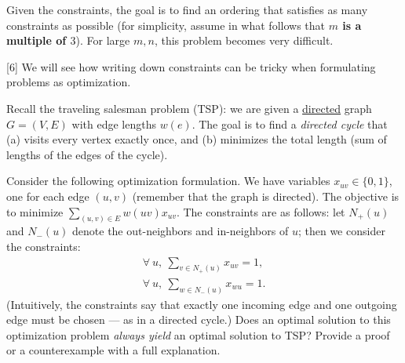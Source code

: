 \documentclass[addpoints, 11pt]{exam}
\begin{document}
\begin{questions}
Given the constraints, the goal is to find an ordering that satisfies as many constraints as possible (for simplicity, assume in what follows that {\bf $m$ is a multiple of $3$}). For large $m, n$, this problem becomes very difficult. 


[6]
We will see how writing down constraints can be tricky when formulating problems as optimization.

Recall the traveling salesman problem (TSP): we are given a \underline{directed} graph $G = (V, E)$ with edge lengths $w(e)$.  The goal is to find a {\em directed cycle} that (a) visits every vertex exactly once, and (b) minimizes the total length (sum of lengths of the edges of the cycle). 

Consider the following optimization formulation. We have variables $x_{uv} \in \{0,1\}$, one for each edge $(u,v)$ (remember that the graph is directed). The objective is to minimize $\sum_{(u,v) \in E} w(uv) x_{uv}$. The constraints are as follows: let $N_+(u)$ and $N_-(u)$ denote the out-neighbors and in-neighbors of $u$; then we consider the constraints:
\begin{align*}
\forall ~u,~ \sum_{v \in N_+(u)} x_{uv} = 1, \\
\forall ~u,~ \sum_{w \in N_-(u)} x_{wu} = 1.
\end{align*}
(Intuitively, the constraints say that exactly one incoming edge and one outgoing edge must be chosen --- as in a directed cycle.) Does an optimal solution to this optimization problem {\em always yield} an optimal solution to TSP? Provide a proof or a counterexample with a full explanation.


\end{questions}
\end{document}
